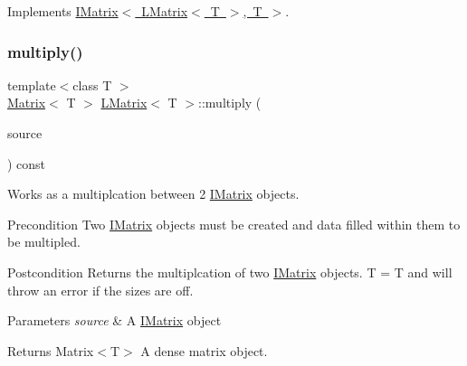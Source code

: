Implements \mbox{\hyperlink{class_i_matrix_a58632b018f4023768db7963e22f468da}{I\+Matrix$<$ L\+Matrix$<$ T $>$, T $>$}}.

\mbox{\label{class_l_matrix_ab3ee1b0b67558d1633245180e72b9e33}} 
\subsubsection{\texorpdfstring{multiply()}{multiply()}\hspace{0.1cm}{\footnotesize\ttfamily [1/6]}}
{\footnotesize\ttfamily template$<$class T $>$ \\
\mbox{\hyperlink{class_matrix}{Matrix}}$<$ T $>$ \mbox{\hyperlink{class_l_matrix}{L\+Matrix}}$<$ T $>$\+::multiply (\begin{DoxyParamCaption}\item[{const \mbox{\hyperlink{class_i_matrix}{I\+Matrix}}$<$ \mbox{\hyperlink{class_matrix}{Matrix}}$<$ T $>$, T $>$ \&}]{source }\end{DoxyParamCaption}) const}



Works as a multiplcation between 2 \mbox{\hyperlink{class_i_matrix}{I\+Matrix}} objects. 

\begin{DoxyPrecond}{Precondition}
Two \mbox{\hyperlink{class_i_matrix}{I\+Matrix}} objects must be created and data filled within them to be multipled. 
\end{DoxyPrecond}
\begin{DoxyPostcond}{Postcondition}
Returns the multiplcation of two \mbox{\hyperlink{class_i_matrix}{I\+Matrix}} objects. T = T and will throw an error if the sizes are off.
\end{DoxyPostcond}

\begin{DoxyParams}{Parameters}
{\em source} & A \mbox{\hyperlink{class_i_matrix}{I\+Matrix}} object \\
\hline
\end{DoxyParams}
\begin{DoxyReturn}{Returns}
Matrix$<$\+T$>$ A dense matrix object. 
\end{DoxyReturn}
\mbox{\label{class_l_matrix_aedac07d7a0deffd244b12b598efe2e1d}} 
